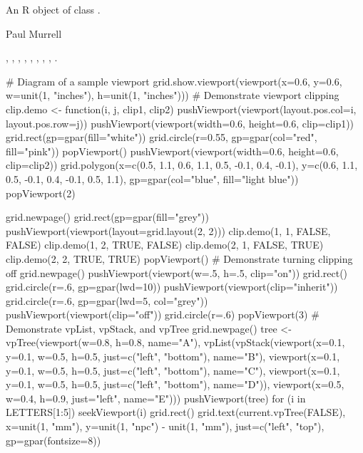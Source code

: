 %
\begin{Value}
An R object of class .
\end{Value}
%
\begin{Author}\relax
Paul Murrell
\end{Author}
%
\begin{SeeAlso}\relax
{},
,
,
,
,
,
,
,
.
\end{SeeAlso}
%
\begin{Examples}
\begin{ExampleCode}
# Diagram of a sample viewport
grid.show.viewport(viewport(x=0.6, y=0.6,
                   w=unit(1, "inches"), h=unit(1, "inches")))
# Demonstrate viewport clipping
clip.demo <- function(i, j, clip1, clip2) {
  pushViewport(viewport(layout.pos.col=i,
                         layout.pos.row=j))
  pushViewport(viewport(width=0.6, height=0.6, clip=clip1))
  grid.rect(gp=gpar(fill="white"))
  grid.circle(r=0.55, gp=gpar(col="red", fill="pink"))
  popViewport()
  pushViewport(viewport(width=0.6, height=0.6, clip=clip2))
  grid.polygon(x=c(0.5, 1.1, 0.6, 1.1, 0.5, -0.1, 0.4, -0.1),
               y=c(0.6, 1.1, 0.5, -0.1, 0.4, -0.1, 0.5, 1.1),
               gp=gpar(col="blue", fill="light blue"))
  popViewport(2)
}

grid.newpage()
grid.rect(gp=gpar(fill="grey"))
pushViewport(viewport(layout=grid.layout(2, 2)))
clip.demo(1, 1, FALSE, FALSE)
clip.demo(1, 2, TRUE, FALSE)
clip.demo(2, 1, FALSE, TRUE)
clip.demo(2, 2, TRUE, TRUE)
popViewport()
# Demonstrate turning clipping off
grid.newpage()
pushViewport(viewport(w=.5, h=.5, clip="on"))
grid.rect()
grid.circle(r=.6, gp=gpar(lwd=10))
pushViewport(viewport(clip="inherit"))
grid.circle(r=.6, gp=gpar(lwd=5, col="grey"))
pushViewport(viewport(clip="off"))
grid.circle(r=.6)
popViewport(3)
# Demonstrate vpList, vpStack, and vpTree
grid.newpage()
tree <- vpTree(viewport(w=0.8, h=0.8, name="A"),
               vpList(vpStack(viewport(x=0.1, y=0.1, w=0.5, h=0.5,
                                       just=c("left", "bottom"), name="B"),
                              viewport(x=0.1, y=0.1, w=0.5, h=0.5, 
                                       just=c("left", "bottom"), name="C"),
                              viewport(x=0.1, y=0.1, w=0.5, h=0.5, 
                                       just=c("left", "bottom"), name="D")),
                      viewport(x=0.5, w=0.4, h=0.9,
                               just="left", name="E")))
pushViewport(tree)
for (i in LETTERS[1:5]) {
  seekViewport(i)
  grid.rect()
  grid.text(current.vpTree(FALSE),
            x=unit(1, "mm"), y=unit(1, "npc") - unit(1, "mm"),
            just=c("left", "top"),
            gp=gpar(fontsize=8))
}
\end{ExampleCode}
\end{Examples}
